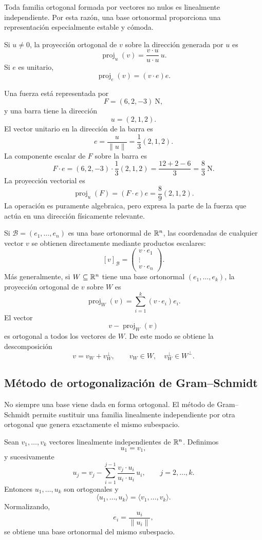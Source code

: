 Toda familia ortogonal formada por vectores no nulos es linealmente independiente. Por esta razón, una base ortonormal proporciona una representación especialmente estable y cómoda.

Si $u\neq0$, la proyección ortogonal de $v$ sobre la dirección generada por $u$ es
\[
\operatorname{proj}_{u}(v)
=
\frac{v\cdot u}{u\cdot u}\,u.
\]
Si $e$ es unitario,
\[
\operatorname{proj}_{e}(v)=(v\cdot e)e.
\]

\begin{example}
Una fuerza está representada por
\[
F=(6,2,-3)\ \mathrm{N},
\]
y una barra tiene la dirección
\[
u=(2,1,2).
\]
El vector unitario en la dirección de la barra es
\[
e=\frac{u}{\|u\|}=\frac{1}{3}(2,1,2).
\]
La componente escalar de $F$ sobre la barra es
\[
F\cdot e
=
(6,2,-3)\cdot\frac13(2,1,2)
=\frac{12+2-6}{3}
=\frac83\ \mathrm{N}.
\]
La proyección vectorial es
\[
\operatorname{proj}_{u}(F)
=(F\cdot e)e
=\frac{8}{9}(2,1,2).
\]
La operación es puramente algebraica, pero expresa la parte de la fuerza que actúa en una dirección físicamente relevante.
\end{example}

Si $\mathcal B=(e_1,\ldots,e_n)$ es una base ortonormal de $\mathbb{R}^n$, las coordenadas de cualquier vector $v$ se obtienen directamente mediante productos escalares:
\[
\boxed{
[v]_{\mathcal B}
=
\begin{pmatrix}
v\cdot e_1\\
\vdots\\
v\cdot e_n
\end{pmatrix}.
}
\]
Más generalmente, si $W\subseteq\mathbb{R}^n$ tiene una base ortonormal $(e_1,\ldots,e_k)$, la proyección ortogonal de $v$ sobre $W$ es
\[
\boxed{
\operatorname{proj}_{W}(v)
=\sum_{i=1}^{k}(v\cdot e_i)e_i.
}
\]
El vector
\[
v-\operatorname{proj}_{W}(v)
\]
es ortogonal a todos los vectores de $W$. De este modo se obtiene la descomposición
\[
v=v_W+v_W^{\perp},
\qquad
v_W\in W,
\quad
v_W^{\perp}\in W^{\perp}.
\]

\subsection{Método de ortogonalización de Gram--Schmidt}

No siempre una base viene dada en forma ortogonal. El método de Gram--Schmidt permite sustituir una familia linealmente independiente por otra ortogonal que genera exactamente el mismo subespacio.

\begin{theorem}
Sean $v_1,\ldots,v_k$ vectores linealmente independientes de $\mathbb{R}^n$. Definimos
\[
u_1=v_1,
\]
y sucesivamente
\[
u_j
=v_j-
\sum_{i=1}^{j-1}
\frac{v_j\cdot u_i}{u_i\cdot u_i}\,u_i,
\qquad j=2,\ldots,k.
\]
Entonces $u_1,\ldots,u_k$ son ortogonales y
\[
\langle u_1,\ldots,u_k\rangle
=
\langle v_1,\ldots,v_k\rangle.
\]
Normalizando,
\[
e_i=\frac{u_i}{\|u_i\|},
\]
se obtiene una base ortonormal del mismo subespacio.
\end{theorem}

